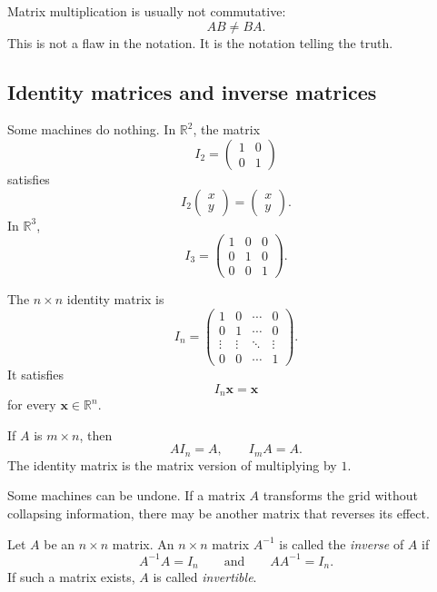 Matrix multiplication is usually not commutative:
\[
    AB\neq BA.
\]
This is not a flaw in the notation.  It is the notation telling the truth.

\subsection{Identity matrices and inverse matrices}

Some machines do nothing.  In \(\mathbb R^2\), the matrix
\[
    I_2=
    \begin{pmatrix}
        1&0\\
        0&1
    \end{pmatrix}
\]
satisfies
\[
    I_2
    \begin{pmatrix}x\\y\end{pmatrix}
    =
    \begin{pmatrix}x\\y\end{pmatrix}.
\]
In \(\mathbb R^3\),
\[
    I_3=
    \begin{pmatrix}
        1&0&0\\
        0&1&0\\
        0&0&1
    \end{pmatrix}.
\]

\begin{definition}
The \(n\times n\) identity matrix is
\[
    I_n=
    \begin{pmatrix}
        1&0&\cdots&0\\
        0&1&\cdots&0\\
        \vdots&\vdots&\ddots&\vdots\\
        0&0&\cdots&1
    \end{pmatrix}.
\]
It satisfies
\[
    I_n\mathbf x=\mathbf x
\]
for every \(\mathbf x\in\mathbb R^n\).
\end{definition}

If \(A\) is \(m\times n\), then
\[
    AI_n=A,
    \qquad
    I_mA=A.
\]
The identity matrix is the matrix version of multiplying by \(1\).

Some machines can be undone.  If a matrix \(A\) transforms the grid without collapsing
information, there may be another matrix that reverses its effect.

\begin{definition}
Let \(A\) be an \(n\times n\) matrix.  An \(n\times n\) matrix \(A^{-1}\) is called the
\emph{inverse} of \(A\) if
\[
    A^{-1}A=I_n
    \qquad\text{and}\qquad
    AA^{-1}=I_n.
\]
If such a matrix exists, \(A\) is called \emph{invertible}.
\end{definition}


